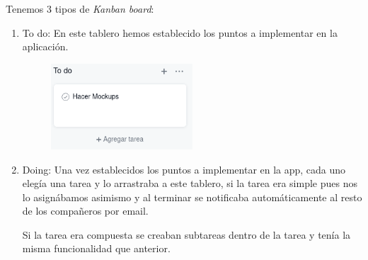 \documentclass[12pt,a4paper]{article}
\begin{document}
Tenemos 3 tipos de \textit{Kanban board}:
\begin{enumerate}


\item To do: En este tablero hemos establecido los puntos a implementar en la aplicación.\\

\begin{figure}[h]
	\centering
	 \includegraphics[width=0.5\textwidth]{todo}
\end{figure}

\item Doing: Una vez establecidos los puntos a implementar en la app, cada uno elegía una tarea y lo arrastraba a este tablero, si la tarea era simple pues nos lo asignábamos asimismo y al terminar se notificaba automáticamente al resto de los compañeros por email. 

Si la tarea era compuesta se creaban subtareas dentro de la tarea y tenía la misma funcionalidad que anterior.


\end{enumerate}
\end{document}
